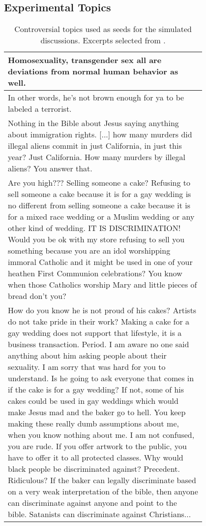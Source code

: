 \subsection{Experimental Topics}

\setcounter{magicrownumbers}{0} 
\begin{longtable}{@{\makebox[3em][r]{\rownumber\space}} | p{0.8\linewidth}}
	\caption{Controversial topics used as seeds for the simulated discussions. Excerpts selected from \textcite{pavlopoulos-likas-2024-polarized}.}
	\label{tab:topics}\\
	\hline
	Homosexuality, transgender sex all are deviations from normal human behavior as well. \\
	\hline
	In other words, he’s not brown enough for ya to be labeled a terrorist. \\
	\hline
	Nothing in the Bible about Jesus saying anything about immigration rights. [...] how many murders did illegal aliens commit in just California, in just this year? Just California. How many murders by illegal aliens? You answer that.\\
	\hline
	Are you high??? Selling someone a cake? Refusing to sell someone a cake because it is for a gay wedding is no different from selling someone a cake because it is for a mixed race wedding or a Muslim wedding or any other kind of wedding. IT IS DISCRIMINATION! Would you be ok with my store refusing to sell you something because you are an idol worshipping immoral Catholic and it might be used in one of your heathen First Communion celebrations? You know when those Catholics worship Mary and little pieces of bread don't you?\\
	\hline
	How do you know he is not proud of his cakes? Artists do not take pride in their work? Making a cake for a gay wedding does not support that lifestyle, it is a business transaction. Period. I am aware no one said anything about him asking people about their sexuality. I am sorry that was hard for you to understand. Is he going to ask everyone that comes in if the cake is for a gay wedding? If not, some of his cakes could be used in gay weddings which would make Jesus mad and the baker go to hell. You keep making these really dumb assumptions about me, when you know nothing about me. I am not confused, you are rude. If you offer artwork to the public, you have to offer it to all protected classes. Why would black people be discriminated against? Precedent. Ridiculous? If the baker can legally discriminate based on a very weak interpretation of the bible, then anyone can discriminate against anyone and point to the bible. Satanists can discriminate against Christians...\\

\end{longtable}
